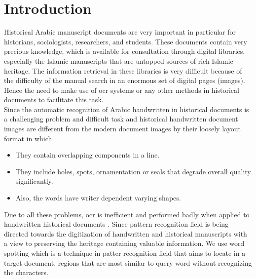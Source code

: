 \chapter{Introduction}


Historical Arabic manuscript documents are very important in particular for historians, sociologists, researchers, and students. These documents contain very precious knowledge, which is available for consultation through digital libraries, especially the Islamic manuscripts that are untapped sources of rich Islamic heritage. The information retrieval in these libraries is very difficult because of the difficulty of the manual search in an enormous set of digital pages (images). Hence the need to make use of \acrfull{ocr} systems or any other methods in historical documents to facilitate this task. \\

Since the automatic recognition of Arabic handwritten in historical documents is a challenging problem and difficult task and historical handwritten document images are different from the modern document images by their loosely layout format in which
\begin{itemize}[itemsep=1pt, topsep=5pt]
    \item They contain overlapping components in a line.
    \item They include holes, spots, ornamentation or seals that degrade overall quality significantly.
    \item Also, the words have writer dependent varying shapes.
\end{itemize}

Due to all these problems, \acrfull{ocr} is inefficient and performed badly when applied to handwritten historical documents \cite{Kassis2016AutomaticSO}. Since pattern recognition field is being directed towards the digitization of handwritten and historical manuscripts with a view to preserving the heritage containing valuable information. We use word spotting which is a technique in patter recognition field that aims to locate in a target document, regions that are most similar to query word without recognizing the characters. \\

